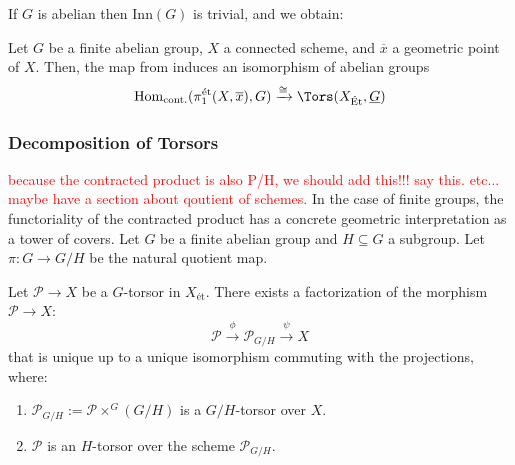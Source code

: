If $G$ is abelian then $\mathrm{Inn}(G)$ is trivial, and we obtain:
\begin{cor}\label{cor:abelian_equivilance_fundamental_torsors}
    Let $G$ be a finite abelian group, $X$ a connected scheme, and $\overline{x}$ a geometric point of $X$. Then, the map from 
     induces an isomorphism of abelian groups
    \begin{equation}
        \mathrm{Hom}_{\mathrm{cont.}}(\pi_1^{\text{ét}}(X, \overline{x}), G) \xrightarrow{\cong} \Tors(X_{\text{\'Et}}, \underline{G})
    \end{equation}
\end{cor}

\subsubsection*{Decomposition of Torsors}
\textcolor{red}{because the contracted product is also P/H, we should add this!!! say this. etc... maybe have a section about qoutient of schemes.}
In the case of finite groups, the functoriality of the contracted product has a concrete geometric interpretation as a tower of covers. Let $G$ be a finite abelian group and $H \subseteq G$ a subgroup. 
Let $\pi: G \to G/H$ be the natural quotient map.

\begin{prop}\label{prop:quotient_torsors_finite}\label{prop:quotient_torsors}
    Let $\mathcal{P} \to X$ be a $G$-torsor in $X_{\text{ét}}$. 
    There exists a factorization of the morphism $\mathcal{P} \to X$:
    \[ \mathcal{P} \xrightarrow{\phi} \mathcal{P}_{G/H} \xrightarrow{\psi} X \]
    that is unique up to a unique isomorphism commuting with the projections, where:
    \begin{enumerate}
        \item $\mathcal{P}_{G/H} := \mathcal{P} \times^G (G/H)$ is a $G/H$-torsor over $X$.
        \item $\mathcal{P}$ is an $H$-torsor over the scheme $\mathcal{P}_{G/H}$.
    \end{enumerate}
\end{prop}

